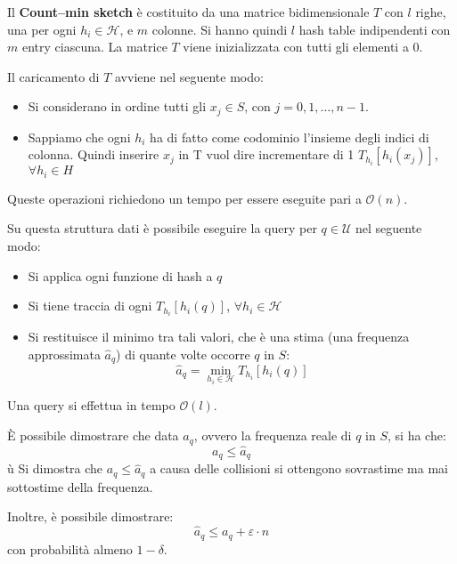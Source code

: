 Il \textbf{Count–min sketch} è costituito da una matrice bidimensionale $T$ con
$l$ righe, una per ogni $h_i \in \mathcal{H}$, e $m$ colonne. Si hanno quindi $l$
hash table indipendenti con $m$ entry ciascuna. La matrice $T$ viene inizializzata
con tutti gli elementi a $0$.

Il caricamento di $T$ avviene nel seguente modo:
\begin{itemize}
    \item Si considerano in ordine tutti gli $x_j \in S$, con $j = 0, 1, \dots, n - 1$.
    \item Sappiamo che ogni $h_i$ ha di fatto come codominio l'insieme degli indici
          di colonna. Quindi inserire $x_j$ in T vuol dire incrementare di 1 $T_{h_i} [h_i(x_j)]$, $\forall h_i \in H$
\end{itemize}
Queste operazioni richiedono un tempo per essere eseguite pari a $\mathcal{O}(n)$.

Su questa struttura dati è possibile eseguire la query per $q \in \mathcal{U}$
nel seguente modo:
\begin{itemize}
    \item Si applica ogni funzione di hash a $q$
    \item Si tiene traccia di ogni $T_{h_i} [h_i(q)]$, $\forall h_i \in \mathcal{H}$
    \item Si restituisce il minimo tra tali valori, che è una stima (una frequenza
          approssimata $\hat{a}_q$) di quante volte occorre $q$ in $S$:
          \begin{equation}
              \hat{a}_q = \min_{h_i \in \mathcal{H}} T_{h_i} [h_i(q)]
          \end{equation}
\end{itemize}
Una query si effettua in tempo $\mathcal{O}(l)$.

È possibile dimostrare che data $a_q$, ovvero la frequenza reale di $q$ in $S$, si ha che:
\begin{equation}
    a_q \leq \hat{a}_q
\end{equation} ù
Si dimostra che $a_q \leq \hat{a}_q$ a causa delle collisioni si ottengono
sovrastime ma mai sottostime della frequenza.

Inoltre, è possibile dimostrare:
\begin{equation}
    \hat{a}_q \leq a_q + \varepsilon \cdot n
\end{equation}
con probabilità almeno $1 - \delta$.

